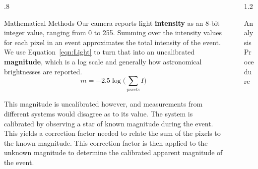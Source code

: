 \documentclass[final]{beamer}
\newlength{\sepwid}
\newlength{\twocolwid}
\begin{document}
\begin{frame}[t]
\begin{columns}[t]
\begin{column}{.8\twocolwid}
\begin{block}{Mathematical Methods}
	Our camera reports light \textbf{intensity} as an 8-bit integer value, ranging from 0 to 255. Summing over the intensity values for each pixel in an event approximates the total intensity of the event. We use Equation~\ref{eqn:Light} to turn that into an uncalibrated \textbf{magnitude}, which is a log scale and generally how astronomical brightnesses are reported. 
\begin{equation}
	m = -2.5 \log\Big(\sum_{pixels} I\Big)
\label{eqn:Light}
\end{equation}

This magnitude is uncalibrated however, and measurements from different systems would disagree as to its value. The system is calibrated by observing a star of known magnitude during the event. This yields a correction factor needed to relate the sum of the pixels to the known magnitude. This correction factor is then applied to the unknown magnitude to determine the calibrated apparent magnitude of the event.


\end{block}

\end{column} %

\begin{column}{\sepwid}\end{column} %

\begin{column}{1.2\twocolwid} %

\begin{alertblock}{Analysis Procedure}


\end{alertblock}
\end{column}
\end{columns}
\end{frame}
\end{document}
